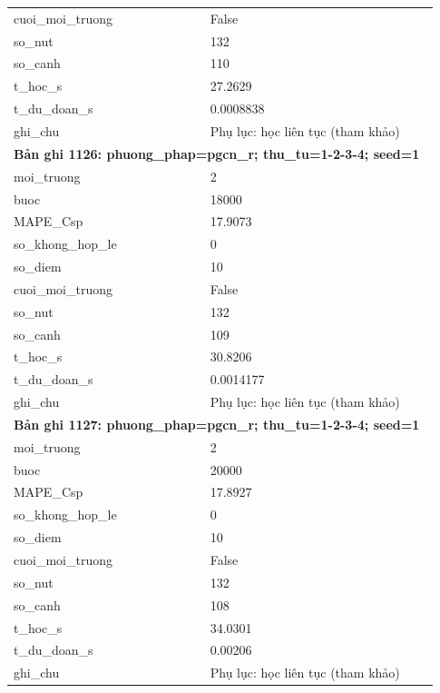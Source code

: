 \begin{longtable}{p{0.43\linewidth}p{0.50\linewidth}}
cuoi\_\allowbreak moi\_\allowbreak truong & False \\
so\_\allowbreak nut & 132 \\
so\_\allowbreak canh & 110 \\
t\_\allowbreak hoc\_\allowbreak s & 27.2629 \\
t\_\allowbreak du\_\allowbreak doan\_\allowbreak s & 0.0008838 \\
ghi\_\allowbreak chu & Phụ lục: học liên tục (tham khảo) \\
\midrule
\multicolumn{2}{p{0.95\linewidth}}{\textbf{Bản ghi 1126: phuong\_phap=pgcn\_r; thu\_tu=1-2-3-4; seed=1}} \\
moi\_\allowbreak truong & 2 \\
buoc & 18000 \\
MAPE\_\allowbreak Csp & 17.9073 \\
so\_\allowbreak khong\_\allowbreak hop\_\allowbreak le & 0 \\
so\_\allowbreak diem & 10 \\
cuoi\_\allowbreak moi\_\allowbreak truong & False \\
so\_\allowbreak nut & 132 \\
so\_\allowbreak canh & 109 \\
t\_\allowbreak hoc\_\allowbreak s & 30.8206 \\
t\_\allowbreak du\_\allowbreak doan\_\allowbreak s & 0.0014177 \\
ghi\_\allowbreak chu & Phụ lục: học liên tục (tham khảo) \\
\midrule
\multicolumn{2}{p{0.95\linewidth}}{\textbf{Bản ghi 1127: phuong\_phap=pgcn\_r; thu\_tu=1-2-3-4; seed=1}} \\
moi\_\allowbreak truong & 2 \\
buoc & 20000 \\
MAPE\_\allowbreak Csp & 17.8927 \\
so\_\allowbreak khong\_\allowbreak hop\_\allowbreak le & 0 \\
so\_\allowbreak diem & 10 \\
cuoi\_\allowbreak moi\_\allowbreak truong & False \\
so\_\allowbreak nut & 132 \\
so\_\allowbreak canh & 108 \\
t\_\allowbreak hoc\_\allowbreak s & 34.0301 \\
t\_\allowbreak du\_\allowbreak doan\_\allowbreak s & 0.00206 \\
ghi\_\allowbreak chu & Phụ lục: học liên tục (tham khảo) \\

\end{longtable}
